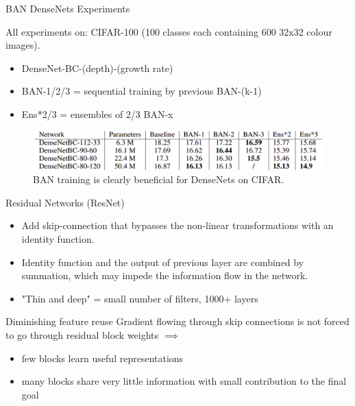 \documentclass{beamer}
\begin{document}
\begin{frame}{BAN DenseNets Experiments }

All experiments on: CIFAR-100 (100 classes each containing 600 32x32 colour images).

\begin{itemize}
\item DenseNet-BC-(depth)-(growth rate)
\item BAN-1/2/3 = sequential training by previous BAN-(k-1)
\item Ens*2/3 = ensembles of 2/3 BAN-x
\end{itemize}

\begin{figure}[h]
\includegraphics[width=\textwidth]{img/denseNet_experiment}
\caption{BAN training is clearly beneficial for DenseNets on CIFAR. \cite{cit:ban}}
\end{figure}

\end{frame}
\begin{frame}{Residual Networks (ResNet)}
\begin{itemize}
\item Add skip-connection that bypasses the non-linear transformations with an identity function.
\item Identity function and the output of previous layer are combined by summation, which may impede the information flow in the network.
\item "Thin and deep" = small number of filters, 1000+ layers
\end{itemize}

\begin{block}{Diminishing feature reuse}
Gradient flowing through skip connections is not forced to go through residual block weights $\implies$ 

\begin{itemize}
\item few blocks learn useful representations 
\item many blocks share very little information with
small contribution to the final goal
\end{itemize}
\end{block}




\end{frame}
\end{document}
